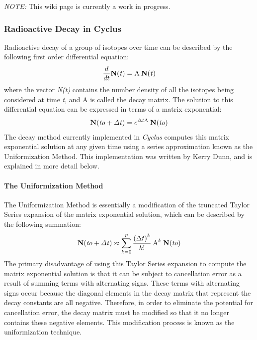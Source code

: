 \documentclass[letterpaper,10pt,english]{sphinxmanual}
\begin{document}
\emph{NOTE:} This wiki page is currently a work in progress.


\subsubsection{Radioactive Decay in Cyclus}
\label{devdoc/decay:radioactive-decay-in-cyclus}\label{devdoc/decay::doc}
Radioactive decay of a group of isotopes over time can be described by the
following first order differential equation:
\begin{gather}
\begin{split}\frac{d}{dt}\mathbf{N(\mathit{t})}=\textrm{A}\: \mathbf{N(\mathit{t})}\end{split}\notag
\end{gather}
where the vector \emph{N(t)} contains the number density of all the
isotopes being considered at time \emph{t}, and A is called the decay
matrix.  The solution to this differential equation can be expressed in terms
of a matrix exponential:
\begin{gather}
\begin{split}\mathbf{N(\mathit{to+\Delta t})}=e^{\Delta t \textrm{A}}\: \mathbf{N(\mathit{to})}\end{split}\notag
\end{gather}
The decay method currently implemented in \emph{Cyclus} computes this matrix
exponential solution at any given time using a series approximation known as
the Uniformization Method.  This implementation was written by Kerry Dunn, and
is explained in more detail below.


\paragraph{The Uniformization Method}
\label{devdoc/decay:the-uniformization-method}
The Uniformization Method is essentially a modification of the truncated Taylor
Series expansion of the matrix exponential solution, which can be described by
the following summation:
\begin{gather}
\begin{split}\mathbf{N(\mathit{to+\Delta t})}\approx \sum_{k=0}^{p}\frac{\left (\Delta t \right )^k}{k!}\: \textrm{A}^k\: \mathbf{N(\mathit{to})}\end{split}\notag
\end{gather}
The primary disadvantage of using this Taylor Series expansion to compute the
matrix exponential solution is that it can be subject to cancellation error as
a result of summing terms with alternating signs.  These terms with alternating
signs occur because the diagonal elements in the decay matrix that represent
the decay constants are all negative.  Therefore, in order to eliminate the
potential for cancellation error, the decay matrix must be modified so that it
no longer contains these negative elements.  This modification process is known
as the uniformization technique.
\end{document}
